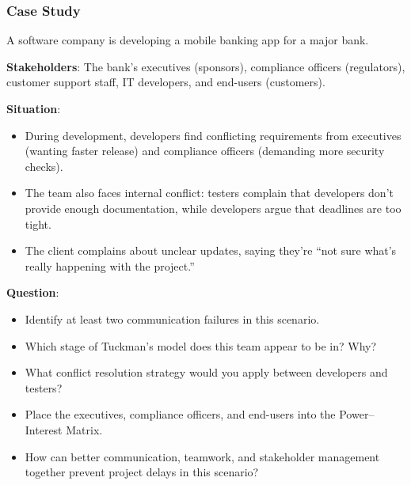 \subsubsection{Case Study}

\indent

A software company is developing a mobile banking app for a major bank.

\noindent\textbf{Stakeholders}: The bank’s executives (sponsors), compliance officers (regulators), customer support staff, IT developers, and end-users (customers).

\noindent\textbf{Situation}:

\begin{itemize}
    \item During development, developers find conflicting requirements from executives (wanting faster release) and compliance officers (demanding more security checks).
    \item The team also faces internal conflict: testers complain that developers don’t provide enough documentation, while developers argue that deadlines are too tight.
    \item The client complains about unclear updates, saying they’re “not sure what’s really happening with the project.”
\end{itemize}

\bigskip

\noindent\textbf{Question}:

\begin{itemize}
    \item Identify at least two communication failures in this scenario.
    \item Which stage of Tuckman’s model does this team appear to be in? Why?
    \item What conflict resolution strategy would you apply between developers and testers?
    \item Place the executives, compliance officers, and end-users into the Power–Interest Matrix.
    \item How can better communication, teamwork, and stakeholder management together prevent project delays in this scenario?
\end{itemize}